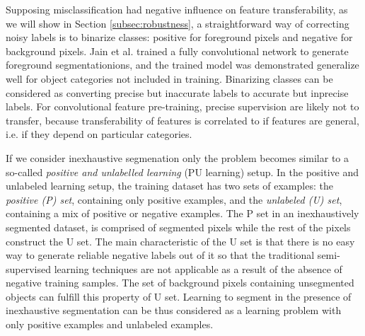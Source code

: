 Supposing misclassification had negative influence on feature transferability, as we will show in Section \ref{subsec:robustness}, a straightforward way of correcting noisy labels is to binarize classes: positive for foreground pixels and negative for background pixels.
Jain et al.\cite{jain2017pixel} trained a fully convolutional network to generate foreground segmentationions, and the trained model was demonstrated generalize well for object categories not included in training.
Binarizing classes can be considered as converting precise but inaccurate labels to accurate but inprecise labels.
For convolutional feature pre-training, precise supervision are likely not to transfer, because transferability of features is correlated to if features are general, i.e. if they depend on particular categories.


If we consider inexhaustive segmenation only the problem becomes similar to a so-called \textit{positive and unlabelled learning} (PU learning) setup\cite{li2005learning}.
In the positive and unlabeled learning setup, the training dataset has two sets of examples: the \textit{positive (P) set}, containing only positive examples, and the \textit{unlabeled (U) set}, containing a mix of positive or negative examples.
The P set in an inexhaustively segmented dataset, is comprised of segmented pixels while the rest of the pixels construct the U set.
The main characteristic of the U set is that there is no easy way to generate reliable negative labels out of it so that the traditional semi-supervised learning techniques are not applicable as a result of the absence of negative training samples.
The set of background pixels containing unsegmented objects can fulfill this property of U set.
Learning to segment in the presence of inexhaustive segmentation can be thus considered as a learning problem with only positive examples and unlabeled examples.


